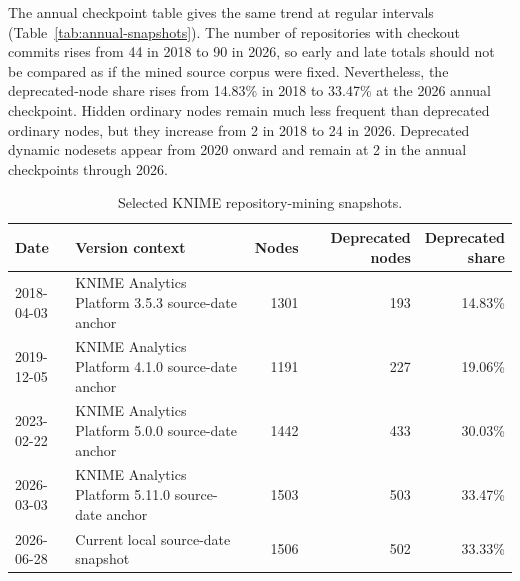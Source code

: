 \documentclass[runningheads]{llncs}
\begin{document}
The annual checkpoint table gives the same trend at regular intervals
(Table~\ref{tab:annual-snapshots}). The number of repositories with checkout
commits rises from 44 in 2018 to 90 in 2026, so early and late totals should
not be compared as if the mined source corpus were fixed. Nevertheless, the
deprecated-node share rises from 14.83\% in 2018 to 33.47\% at the 2026 annual
checkpoint. Hidden ordinary nodes remain much less frequent than deprecated
ordinary nodes, but they increase from 2 in 2018 to 24 in 2026. Deprecated
dynamic nodesets appear from 2020 onward and remain at 2 in the annual
checkpoints through 2026.

\begin{table}
\centering
\caption{Selected KNIME repository-mining snapshots.}
\label{tab:selected-snapshots}
\scriptsize
\begin{tabular}{lp{}rrr}
\toprule
Date & Version context & Nodes & Deprecated nodes &
\shortstack{Deprecated\\share} \\
\midrule
2018-04-03 & KNIME Analytics Platform 3.5.3 source-date anchor & 1301 &
193 & 14.83\% \\
2019-12-05 & KNIME Analytics Platform 4.1.0 source-date anchor & 1191 &
227 & 19.06\% \\
2023-02-22 & KNIME Analytics Platform 5.0.0 source-date anchor & 1442 &
433 & 30.03\% \\
2026-03-03 & KNIME Analytics Platform 5.11.0 source-date anchor & 1503 &
503 & 33.47\% \\
2026-06-28 & Current local source-date snapshot & 1506 & 502 & 33.33\% \\
\bottomrule
\end{tabular}
\end{table}
\end{document}
